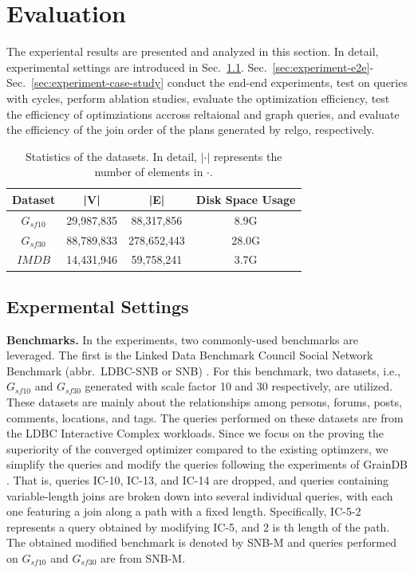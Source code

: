 \section{Evaluation}
The experiental results are presented and analyzed in this section.
In detail, experimental settings are introduced in Sec.~\ref{sec:experiment-settings}.
Sec.~\ref{sec:experiment-e2e}-Sec.~\ref{sec:experiment-case-study} conduct the end-end experiments, test on queries with cycles, perform ablation studies, evaluate the optimization efficiency, test the efficiency of optimziations accross reltaional and graph queries, and evaluate the efficiency of the join order of the plans generated by relgo, respectively.

\begin{table}[t]
    \centering
    \begin{tabular}{c|c|c|c}
    \hline
    Dataset & |V| & |E| & Disk Space Usage\\ 
    \hline
    $G_{sf10}$& 29,987,835 & 88,317,856 & 8.9G \\
    \hline
    $G_{sf30}$ & 88,789,833 & 278,652,443 & 28.0G\\
    \hline
    $IMDB$ & 14,431,946 & 59,758,241 & 3.7G \\
    \hline
    \end{tabular}
    \caption{Statistics of the datasets. In detail, $|\cdot|$ represents the number of elements in $\cdot$.}
    \label{table:experiment-datasets}
\end{table}

\subsection{Expermental Settings}
\label{sec:experiment-settings}

\textbf{Benchmarks.} In the experiments, two commonly-used benchmarks are leveraged.
The first is the Linked Data Benchmark Council Social Network Benchmark (abbr.~LDBC-SNB or SNB) \cite{ldbc_snb}.
For this benchmark, two datasets, i.e., $G_{sf10}$ and $G_{sf30}$ generated with scale factor 10 and 30 respectively, are utilized.
These datasets are mainly about the relationships among persons, forums, posts, comments, locations, and tags.
The queries performed on these datasets are from the LDBC Interactive Complex workloads.
Since we focus on the proving the superiority of the converged optimizer compared to the existing optimzers, we simplify the queries and modify the queries following the experiments of GrainDB \cite{graindb}.
That is, queries IC-10, IC-13, and IC-14 are dropped, and queries containing variable-length joins are broken down into several individual queries, with each one featuring a join along a path with a fixed length.
Specifically, IC-5-2 represents a query obtained by modifying IC-5, and 2 is th length of the path.
The obtained modified benchmark is denoted by SNB-M and queries performed on $G_{sf10}$ and $G_{sf30}$ are from SNB-M.

